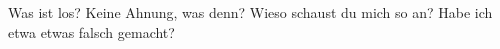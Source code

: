 \documentclass[a4paper,11pt,DIV=calc]{scrartcl}
\begin{document}
	\begin{dialogue}
		 Was ist los? 
		 Keine Ahnung, was denn?  Wieso schaust du mich so an? Habe ich etwa etwas falsch gemacht?
	\end{dialogue}
	
\end{document}
